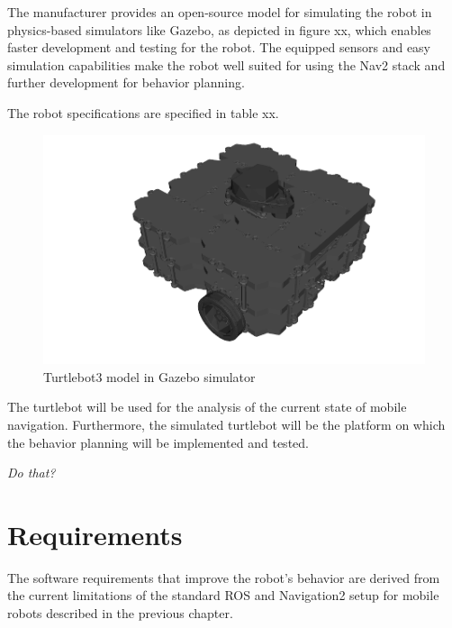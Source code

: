 The manufacturer provides an open-source model for simulating the robot in physics-based simulators like Gazebo, as depicted in figure xx, which enables faster development and testing for the robot. 
The equipped sensors and easy simulation capabilities make the robot well suited for using the Nav2 stack and further development for behavior planning. 

The robot specifications are specified in table xx.  \\

\begin{figure}[h!]
	\includegraphics[width=1.0\textwidth]{images/turtlebot_sim.png}
	\caption{Turtlebot3 model in Gazebo simulator}
\end{figure}

The turtlebot will be used for the analysis of the current state of mobile navigation. Furthermore, the simulated turtlebot will be the platform on which the behavior planning will be implemented and tested.




\textit{Do that?}

\section{Requirements}

The software requirements that improve the robot's behavior are derived from the current limitations of the standard ROS and Navigation2 setup for mobile robots described in the previous chapter.

